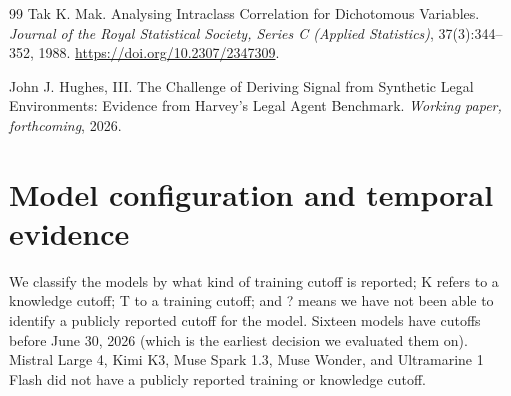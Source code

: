 \documentclass[11pt]{article}
\begin{document}
\begin{thebibliography}{99}
 Tak K. Mak. Analysing Intraclass Correlation for Dichotomous Variables. \emph{Journal of the Royal Statistical Society, Series C (Applied Statistics)}, 37(3):344--352, 1988. \url{https://doi.org/10.2307/2347309}.

 John J. Hughes, III. The Challenge of Deriving Signal from Synthetic Legal Environments: Evidence from Harvey's Legal Agent Benchmark. \emph{Working paper, forthcoming}, 2026.

\end{thebibliography}

\clearpage

\appendix
\section{Model configuration and temporal evidence}
\label{app:cutoffs}\label{app:protocol}
We classify the models by what kind of training cutoff is reported; K refers to a knowledge cutoff; T to a training cutoff; and ? means we have not been able to identify a publicly reported cutoff for the model. Sixteen models have cutoffs before June 30, 2026 (which is the earliest decision we evaluated them on). Mistral Large 4, Kimi K3, Muse Spark 1.3, Muse Wonder, and Ultramarine 1 Flash did not have a publicly reported training or knowledge cutoff.
\end{document}
